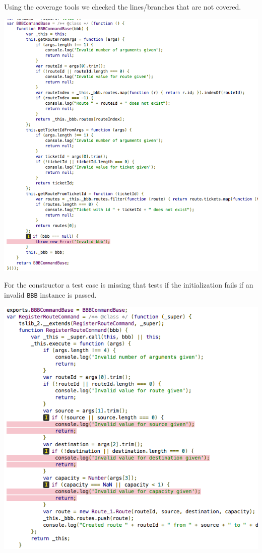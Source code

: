 \documentclass[11pt]{article}
\begin{document}
Using the coverage tools we checked the lines/branches that are not covered. 

\begin{center}
\includegraphics[width=.9\linewidth]{documentation.org.img/Iteration2_Constructor_Coverage.png}
\end{center}

For the constructor a test case is missing that tests if the initialization fails if an invalid \texttt{BBB} instance is passed.

\begin{center}
\includegraphics[width=.9\linewidth]{documentation.org.img/Iteration2_Register_Coverage.png}
\end{center}
\end{document}
